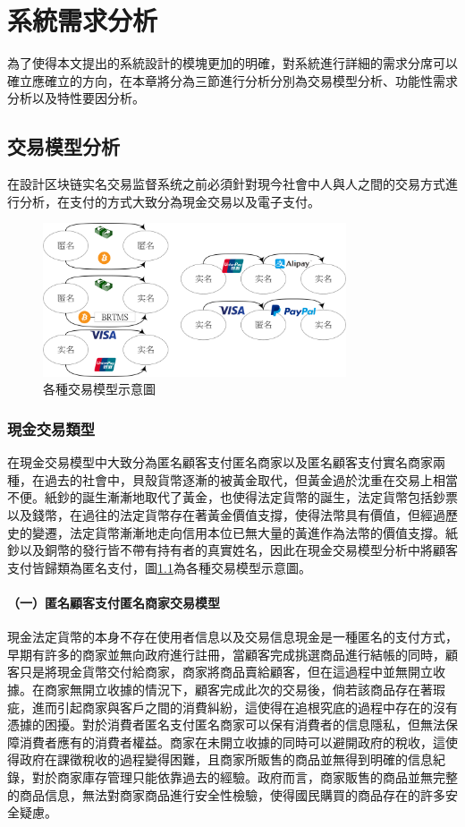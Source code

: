 \chapter{系統需求分析}

為了使得本文提出的系統設計的模塊更加的明確，對系統進行詳細的需求分席可以確立應確立的方向，在本章將分為三節進行分析分別為交易模型分析、功能性需求分析以及特性要因分析。


\section{交易模型分析}

在設計区块链实名交易监督系统之前必須針對現今社會中人與人之間的交易方式進行分析，在支付的方式大致分為現金交易以及電子支付。
\begin{figure}[!htbp]
	\centering
	\includegraphics[width = 0.8\textwidth]{modeall.png}
	\caption{各種交易模型示意圖}\label{modeall}
\end{figure}

	\subsection{現金交易類型}
	在現金交易模型中大致分為匿名顧客支付匿名商家以及匿名顧客支付實名商家兩種，在過去的社會中，貝殼貨幣逐漸的被黃金取代，但黃金過於沈重在交易上相當不便。紙鈔的誕生漸漸地取代了黃金，也使得法定貨幣的誕生，法定貨幣包括鈔票以及錢幣，在過往的法定貨幣存在著黃金價值支撐，使得法幣具有價值，但經過歷史的變遷，法定貨幣漸漸地走向信用本位已無大量的黃進作為法幣的價值支撐。紙鈔以及銅幣的發行皆不帶有持有者的真實姓名，因此在現金交易模型分析中將顧客支付皆歸類為匿名支付，圖\ref{modeall}為各種交易模型示意圖。

		\subsubsection{（一）匿名顧客支付匿名商家交易模型}
		現金法定貨幣的本身不存在使用者信息以及交易信息現金是一種匿名的支付方式，早期有許多的商家並無向政府進行註冊，當顧客完成挑選商品進行結帳的同時，顧客只是將現金貨幣交付給商家，商家將商品賣給顧客，但在這過程中並無開立收據。在商家無開立收據的情況下，顧客完成此次的交易後，倘若該商品存在著瑕疵，進而引起商家與客戶之間的消費糾紛，這使得在追根究底的過程中存在的沒有憑據的困擾。對於消費者匿名支付匿名商家可以保有消費者的信息隱私，但無法保障消費者應有的消費者權益。商家在未開立收據的同時可以避開政府的稅收，這使得政府在課徵稅收的過程變得困難，且商家所販售的商品並無得到明確的信息紀錄，對於商家庫存管理只能依靠過去的經驗。政府而言，商家販售的商品並無完整的商品信息，無法對商家商品進行安全性檢驗，使得國民購買的商品存在的許多安全疑慮。

